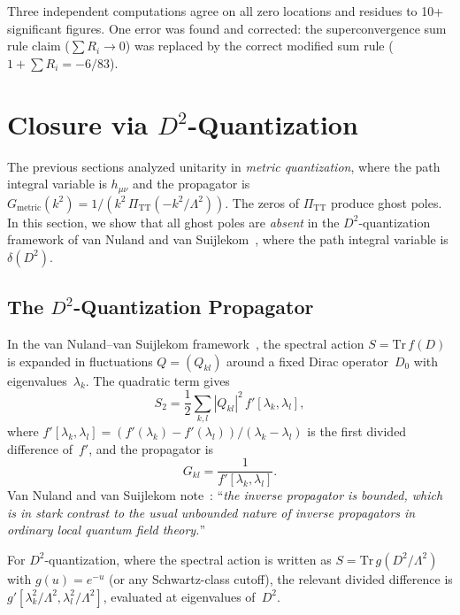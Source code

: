 \documentclass[11pt,a4paper]{article}
\newcommand{\PiTT}{\Pi_{\mathrm{TT}}}
\begin{document}
Three independent computations agree on all zero
locations and residues to 10+ significant figures.  One error was found
and corrected: the superconvergence sum rule claim ($\sum R_i \to 0$)
was replaced by the correct modified sum rule ($1 + \sum R_i = -6/83$).


\section{Closure via $D^2$-Quantization}
\label{sec:D2-closure}

The previous sections analyzed unitarity in \emph{metric quantization}, where
the path integral variable is $h_{\mu\nu}$ and the propagator is
$G_{\mathrm{metric}}(k^2) = 1/(k^2\,\PiTT(-k^2/\Lambda^2))$.  The zeros of
$\PiTT$ produce ghost poles.  In this section, we show that all ghost poles
are \emph{absent} in the $D^2$-quantization framework of van Nuland and
van Suijlekom~\cite{vNvS2021}, where the path integral variable is
$\delta(D^2)$.

\subsection{The $D^2$-Quantization Propagator}

In the van Nuland--van Suijlekom framework~\cite{vNvS2021}, the spectral
action $S = \mathrm{Tr}\,f(D)$ is expanded in fluctuations $Q = (Q_{kl})$
around a fixed Dirac operator~$D_0$ with eigenvalues~$\lambda_k$.  The
quadratic term gives
\begin{equation}\label{eq:D2-quadratic}
  S_2 = \frac{1}{2}\sum_{k,l} |Q_{kl}|^2\,f'[\lambda_k, \lambda_l],
\end{equation}
where $f'[\lambda_k, \lambda_l] = (f'(\lambda_k) - f'(\lambda_l))/(\lambda_k
- \lambda_l)$ is the first divided difference of~$f'$, and the propagator is
\begin{equation}\label{eq:D2-propagator}
  \boxed{G_{kl} = \frac{1}{f'[\lambda_k, \lambda_l]}.}
\end{equation}
Van Nuland and van Suijlekom note~\cite[Section~3]{vNvS2021}: ``\textit{the
inverse propagator is bounded, which is in stark contrast to the usual
unbounded nature of inverse propagators in ordinary local quantum field
theory.}''

For $D^2$-quantization, where the spectral action is written as
$S = \mathrm{Tr}\,g(D^2/\Lambda^2)$ with $g(u) = e^{-u}$ (or any
Schwartz-class cutoff), the relevant divided difference is
$g'[\lambda_k^2/\Lambda^2, \lambda_l^2/\Lambda^2]$, evaluated at
eigenvalues of~$D^2$.
\end{document}
